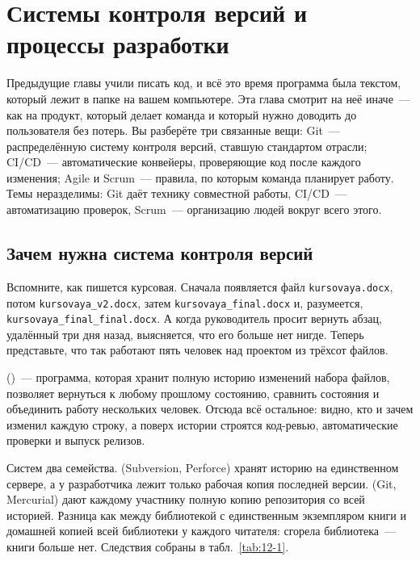 \chapter{Системы контроля версий и процессы разработки}
\label{ch:12}

Предыдущие главы учили писать код, и всё это время программа была текстом, который лежит в папке на вашем компьютере. Эта глава смотрит на неё иначе~--- как на продукт, который делает команда и который нужно доводить до пользователя без потерь. Вы разберёте три связанные вещи: Git~--- распределённую систему контроля версий, ставшую стандартом отрасли; CI/CD~--- автоматические конвейеры, проверяющие код после каждого изменения; Agile и Scrum~--- правила, по которым команда планирует работу. Темы неразделимы: Git даёт технику совместной работы, CI/CD~--- автоматизацию проверок, Scrum~--- организацию людей вокруг всего этого.

\section{Зачем нужна система контроля версий}

\begin{sloppypar}
Вспомните, как пишется курсовая. Сначала появляется файл \texttt{kursovaya.docx}, потом \texttt{kursovaya\_v2.docx}, затем \texttt{kursovaya\_final.docx} и, разумеется, \texttt{kursovaya\_final\_final.docx}. А когда руководитель просит вернуть абзац, удалённый три дня назад, выясняется, что его больше нет нигде. Теперь представьте, что так работают пять человек над проектом из трёхсот файлов.
\end{sloppypar}

 ()~--- программа, которая хранит полную историю изменений набора файлов, позволяет вернуться к любому прошлому состоянию, сравнить состояния и объединить работу нескольких человек. Отсюда всё остальное: видно, кто и зачем изменил каждую строку, а поверх истории строятся код-ревью, автоматические проверки и выпуск релизов.

Систем два семейства.  (Subversion, Perforce) хранят историю на единственном сервере, а у разработчика лежит только рабочая копия последней версии.  (Git, Mercurial) дают каждому участнику полную копию репозитория со всей историей. Разница как между библиотекой с единственным экземпляром книги и домашней копией всей библиотеки у каждого читателя: сгорела библиотека~--- книги больше нет. Следствия собраны в табл.~\ref{tab:12-1}.

